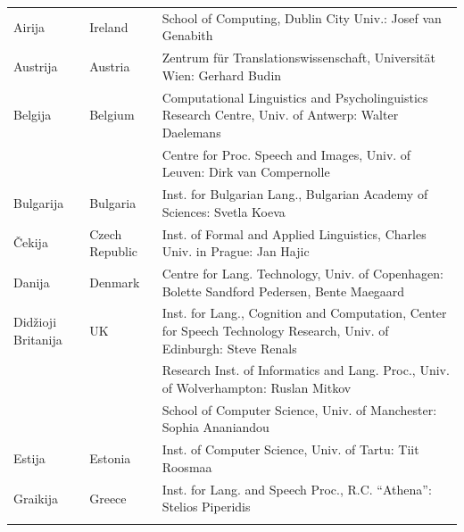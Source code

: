 \documentclass[]{../metanetpaper}
\begin{document}
\cleardoublepage

\appendix
{}

%


  
\cleardoublepage

\label{metanetmembers}

\small
\begin{longtable}{llp{105mm}}
  Airija & \textcolor{grey1}{Ireland} & School of Computing, Dublin City Univ.: Josef van Genabith\\ \addlinespace
  Austrija & \textcolor{grey1}{Austria} & Zentrum für Translationswissenschaft, Universität Wien: Gerhard Budin\\ \addlinespace 
  Belgija & \textcolor{grey1}{Belgium} & Computational Linguistics and Psycholinguistics Research Centre, Univ. of Antwerp: Walter Daelemans\\ \addlinespace
  & & Centre for Proc. Speech and Images, Univ. of Leuven: Dirk van Compernolle \\ \addlinespace
  Bulgarija & \textcolor{grey1}{Bulgaria} & Inst. for Bulgarian Lang., Bulgarian Academy of Sciences: Svetla Koeva \\ \addlinespace
  Čekija & \textcolor{grey1}{Czech Republic} & Inst. of Formal and Applied Linguistics, Charles Univ. in Prague: Jan Hajic \\ \addlinespace
  Danija &  \textcolor{grey1}{Denmark} & Centre for Lang. Technology, Univ. of Copenhagen: Bolette Sandford Pedersen, Bente Maegaard\\ \addlinespace
  Didžioji Britanija & \textcolor{grey1}{UK} & Inst. for Lang., Cognition and Computation, Center for Speech Technology Research, Univ. of Edinburgh: Steve Renals \\ \addlinespace 
  & & Research Inst. of Informatics and Lang. Proc., Univ. of Wolverhampton: Ruslan Mitkov \\ \addlinespace 
  & & School of Computer Science, Univ. of Manchester: Sophia Ananiandou \\ \addlinespace
  Estija & \textcolor{grey1}{Estonia} & Inst. of Computer Science, Univ. of Tartu: Tiit Roosmaa\\ \addlinespace
  Graikija & \textcolor{grey1}{Greece} & Inst. for Lang. and Speech Proc., R.C. “Athena”: Stelios Piperidis\\ \addlinespace

\end{longtable}
\end{document}

